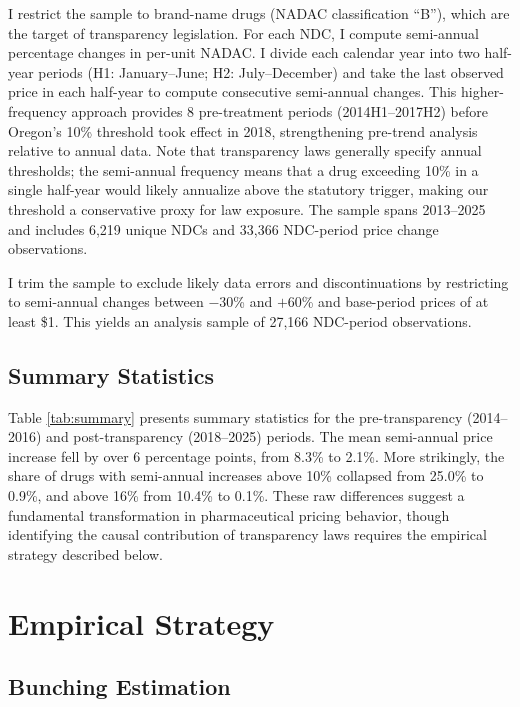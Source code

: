 \documentclass[12pt]{article}
\begin{document}
I restrict the sample to brand-name drugs (NADAC classification ``B''), which are the target of transparency legislation. For each NDC, I compute semi-annual percentage changes in per-unit NADAC. I divide each calendar year into two half-year periods (H1: January--June; H2: July--December) and take the last observed price in each half-year to compute consecutive semi-annual changes. This higher-frequency approach provides 8 pre-treatment periods (2014H1--2017H2) before Oregon's 10\% threshold took effect in 2018, strengthening pre-trend analysis relative to annual data. Note that transparency laws generally specify annual thresholds; the semi-annual frequency means that a drug exceeding 10\% in a single half-year would likely annualize above the statutory trigger, making our threshold a conservative proxy for law exposure. The sample spans 2013--2025 and includes 6,219 unique NDCs and 33,366 NDC-period price change observations.

I trim the sample to exclude likely data errors and discontinuations by restricting to semi-annual changes between $-30$\% and $+60$\% and base-period prices of at least \$1. This yields an analysis sample of 27,166 NDC-period observations.

\subsection{Summary Statistics}



Table \ref{tab:summary} presents summary statistics for the pre-transparency (2014--2016) and post-transparency (2018--2025) periods. The mean semi-annual price increase fell by over 6 percentage points, from 8.3\% to 2.1\%. More strikingly, the share of drugs with semi-annual increases above 10\% collapsed from 25.0\% to 0.9\%, and above 16\% from 10.4\% to 0.1\%. These raw differences suggest a fundamental transformation in pharmaceutical pricing behavior, though identifying the causal contribution of transparency laws requires the empirical strategy described below.


\section{Empirical Strategy}

\subsection{Bunching Estimation}
\end{document}
